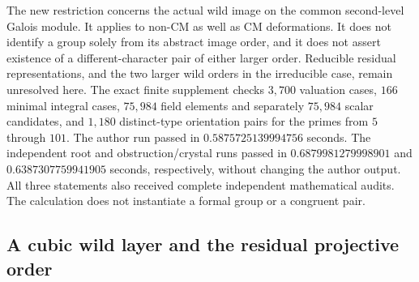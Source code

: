 \begin{remark}
\label{rem:B-RD55-scope}
The new restriction concerns the actual wild image on the
common second-level Galois module. It applies to non-CM as
well as CM deformations. It does not identify a group solely
from its abstract image order, and it does not assert existence
of a different-character pair of either larger order.
Reducible residual representations, and the two larger wild
orders in the irreducible case, remain unresolved here.
The exact finite supplement
checks $3{,}700$ valuation cases, $166$ minimal integral cases,
$75{,}984$ field elements and separately $75{,}984$ scalar
candidates, and $1{,}180$
distinct-type orientation pairs for the primes from $5$ through
$101$. The author run passed in $0.5875725139994756$ seconds.
The independent root and obstruction/crystal runs passed in
$0.6879981279998901$ and $0.6387307759941905$ seconds,
respectively, without changing the author output. All three
statements also received complete independent mathematical audits.
The calculation does not instantiate a formal group or a congruent pair.
\end{remark}


\subsection{A cubic wild layer and the residual projective order}

